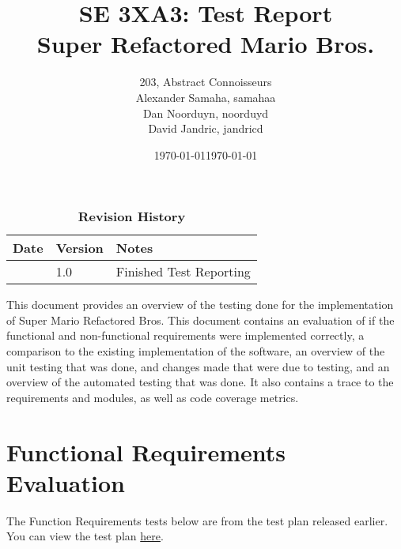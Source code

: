\documentclass[12pt, titlepage]{article}
\title{SE 3XA3: Test Report\\Super Refactored Mario Bros.}
\author{203, Abstract Connoisseurs
		\\ Alexander Samaha, samahaa
		\\ Dan Noorduyn, noorduyd
		\\ David Jandric, jandricd
}
\date{\today}
\begin{document}
\maketitle

\tableofcontents
\listoftables
\listoffigures

\begin{table}[bp]
\caption{\bf Revision History}
\begin{tabularx}{\textwidth}{p{3cm}p{2cm}X}
\toprule {\bf Date} & {\bf Version} & {\bf Notes}\\
\midrule
\date{\today} & 1.0 & Finished Test Reporting\\
\bottomrule
\end{tabularx}
\end{table}

\newpage


This document provides an overview of the testing done for the implementation of Super Mario Refactored Bros. This document contains an evaluation of if the functional and non-functional requirements were implemented correctly, a comparison to the existing implementation of the software, an overview of the unit testing that was done, and changes made that were due to testing, and an overview of the automated testing that was done. It also contains a trace to the requirements and modules, as well as code coverage metrics.

\section{Functional Requirements Evaluation}
The Function Requirements tests below are from the test plan released earlier. You can view the test plan \href{https://gitlab.cas.mcmaster.ca/jandricd/super-refactored-mario-bros/-/blob/master/Doc/TestPlan/TestPlan.pdf}{here}.
\end{document}
